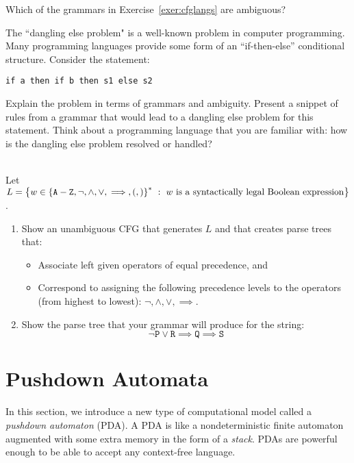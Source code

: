 \documentclass[twoside,letterpaper,openany]{book}
\begin{document}
\begin{exer}
Which of the grammars in Exercise~\ref{exer:cfglangs} are ambiguous?
\end{exer}

\begin{exer}
The ``dangling else problem" is a well-known problem in computer programming. Many programming languages provide some form of an ``if-then-else'' conditional structure.  Consider the statement:
\begin{verbatim}
if a then if b then s1 else s2
\end{verbatim}
Explain the problem in terms of grammars and ambiguity. Present a snippet of rules from a grammar that would lead to a dangling else problem for this statement. Think about a programming language that you are familiar with: how is the dangling else problem resolved or handled?
\end{exer}

\begin{exer}
~\\Let  $L = \left\lbrace w \in \left\lbrace \texttt{A} - \texttt{Z}, \neg, \wedge, \vee, \implies, \left(, \right) \right\rbrace^{*}\ :\ w~\textrm{is a syntactically legal Boolean expression} \right\rbrace$.
\begin{enumerate}
\item Show an unambiguous CFG that generates $L$ and that creates parse trees that:
\begin{itemize}
\item Associate left given operators of equal precedence, and
\item Correspond to assigning the following precedence levels to the operators (from highest to lowest): $\neg, \wedge, \vee, \implies$.
\end{itemize}
\item Show the parse tree that your grammar will produce for the string:
\[ \neg\texttt{P}\vee\texttt{R}\implies\texttt{Q}\implies\texttt{S} \]
\end{enumerate}
\end{exer}



\clearpage

\section{Pushdown Automata}

\begin{discussion}
In this section, we introduce a new type of computational model called a \emph{pushdown automaton} (PDA). A PDA is like a nondeterministic finite automaton augmented with some extra memory in the form of a \emph{stack}. PDAs are powerful enough to be able to accept any context-free language.
\end{discussion}
\end{document}
